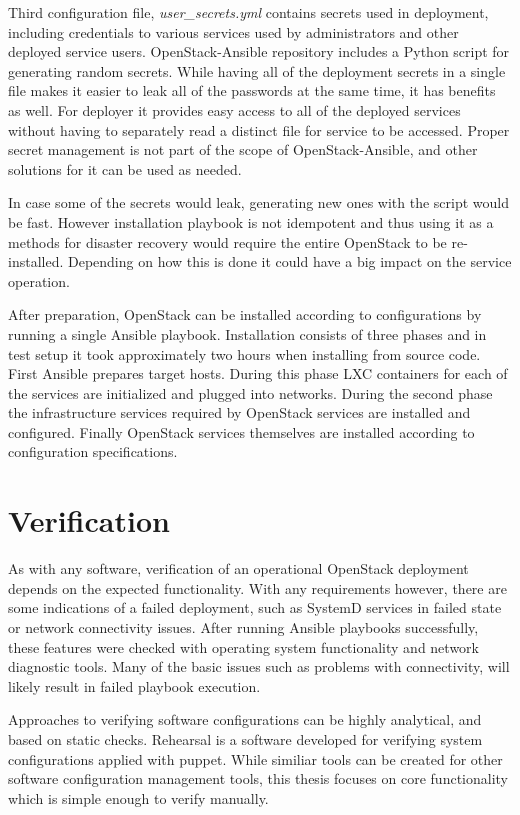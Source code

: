 Third configuration file, \textit{user\_secrets.yml} contains secrets used in
deployment, including credentials to various services used by administrators
and other deployed service users. OpenStack-Ansible repository includes a
Python script for generating random secrets. While having all of the deployment
secrets in a single file makes it easier to leak all of the passwords at the
same time, it has benefits as well. For deployer it provides easy access to all
of the deployed services without having to separately read a distinct file for
service to be accessed. Proper secret management is not part of the scope of
OpenStack-Ansible, and other solutions for it can be used as needed.

In case some of the secrets would leak, generating new ones with the script
would be fast. However installation playbook is not idempotent and thus using
it as a methods for disaster recovery would require the entire OpenStack to be
re-installed. Depending on how this is done it could have a big impact on the
service operation.

After preparation, OpenStack can be installed according to configurations by
running a single Ansible playbook. Installation consists of three phases and
in test setup it took approximately two hours when installing from source code.
First Ansible prepares target hosts. During this phase LXC containers for each
of the services are initialized and plugged into networks. During the second
phase the infrastructure services required by OpenStack services are installed
and configured. Finally OpenStack services themselves are installed according
to configuration specifications.

\section{Verification}

As with any software, verification of an operational OpenStack deployment
depends on the expected functionality. With any requirements however, there are
some indications of a failed deployment, such as SystemD services in failed
state or network connectivity issues. After running Ansible playbooks
successfully, these features were checked with operating system functionality
and network diagnostic tools. Many of the basic issues such as problems with
connectivity, will likely result in failed playbook execution.

Approaches to verifying software configurations can be highly analytical, and
based on static checks. Rehearsal \cite{shambaugh2016rehearsal} is a software
developed for verifying system configurations applied with puppet. While
similiar tools can be created for other software configuration management
tools, this thesis focuses on core functionality which is simple enough to
verify manually.

